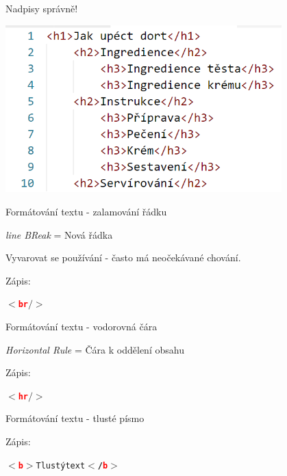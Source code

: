 \documentclass[aspectratio=1610]{beamer}
\begin{document}
\begin{frame}{Nadpisy správně!}
    \begin{center}
        \includegraphics[width=0.8\textwidth]{img/html-cake.png}
    \end{center}
\end{frame}

\begin{frame}{Formátování textu - zalamování řádku}
    \begin{cardTiny}
        \begin{flushleft}
            \textit{line BReak} = Nová řádka

            Vyvarovat se používání - často má neočekávané chování.

            Zápis: \begin{alltt}\textbf{$<$\textcolor{red}{br}$ />$}\end{alltt}
        \end{flushleft}
    \end{cardTiny}
\end{frame}

\begin{frame}{Formátování textu - vodorovná čára}
    \begin{cardTiny}
        \begin{flushleft}
            \textit{Horizontal Rule} = Čára k oddělení obsahu 

            Zápis: \begin{alltt}\textbf{$<$\textcolor{red}{hr}$ />$}\end{alltt}
        \end{flushleft}
    \end{cardTiny}
\end{frame}

\begin{frame}{Formátování textu - tlusté písmo}
    \begin{cardTiny}
        \begin{flushleft}
            Zápis: \begin{alltt}\textbf{$<$\textcolor{red}{b}$>$}Tlustý text\textbf{$<$/\textcolor{red}{b}$>$}\end{alltt}
        \end{flushleft}
    \end{cardTiny}
\end{frame}
\end{document}
